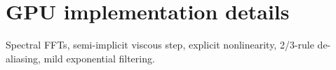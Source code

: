 \section{GPU implementation details}
Spectral FFTs, semi-implicit viscous step, explicit nonlinearity, 2/3-rule de-aliasing, mild exponential filtering.

